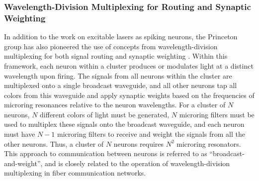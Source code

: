 \subsubsection{Wavelength-Division Multiplexing for Routing and Synaptic Weighting} 
In addition to the work on excitable lasers as spiking neurons, the Princeton group has also pioneered the use of concepts from wavelength-division multiplexing for both signal routing and synaptic weighting \cite{tana20142,tafe2017}. Within this framework, each neuron within a cluster produces or modulates light at a distinct wavelength upon firing. The signals from all neurons within the cluster are multiplexed onto a single broadcast waveguide, and all other neurons tap all colors from this waveguide and apply synaptic weights based on the frequencies of microring resonances relative to the neuron wavelengths. For a cluster of $N$ neurons, $N$ different colors of light must be generated, $N$ microring filters must be used to multiplex these signals onto the broadcast waveguide, and each neuron must have $N-1$ microring filters to receive and weight the signals from all the other neurons. Thus, a cluster of $N$ neurons requires $N^2$ microring resonators. This approach to communication between neurons is referred to as ``broadcast-and-weight'', and is closely related to the operation of wavelength-division multiplexing in fiber communication networks.

